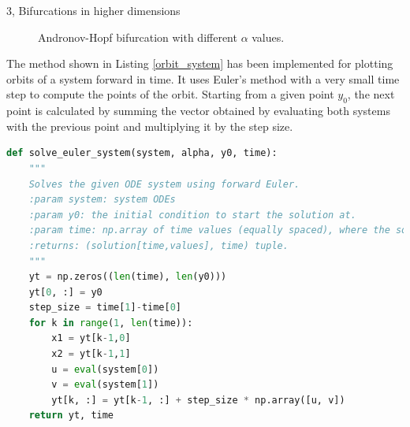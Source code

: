 \documentclass[10pt,a4paper]{article}
\begin{document}
\begin{task}{3, Bifurcations in higher dimensions}
\begin{figure} [H]
    \centering
    \caption{Andronov-Hopf bifurcation with different $\alpha$ values.}
    \label{andronov-hopf}
\end{figure}

\newpage

The method shown in Listing \ref{orbit_system} has been implemented for plotting orbits of a system forward in time. It uses Euler's method with a very small time step to compute the points of the orbit. Starting from a given point $y_0$, the next point is calculated by summing the vector obtained by evaluating both systems with the previous point and multiplying it by the step size.

\begin{lstlisting}[language = Python, caption={Method for plotting orbits of a system forward in time}, label={orbit_system}]
def solve_euler_system(system, alpha, y0, time):
    """
    Solves the given ODE system using forward Euler.
    :param system: system ODEs
    :param y0: the initial condition to start the solution at.
    :param time: np.array of time values (equally spaced), where the solution must be obtained.
    :returns: (solution[time,values], time) tuple.
    """
    yt = np.zeros((len(time), len(y0)))
    yt[0, :] = y0
    step_size = time[1]-time[0]
    for k in range(1, len(time)):
        x1 = yt[k-1,0]
        x2 = yt[k-1,1]
        u = eval(system[0])
        v = eval(system[1])
        yt[k, :] = yt[k-1, :] + step_size * np.array([u, v])
    return yt, time
\end{lstlisting}


\end{task}
\end{document}
